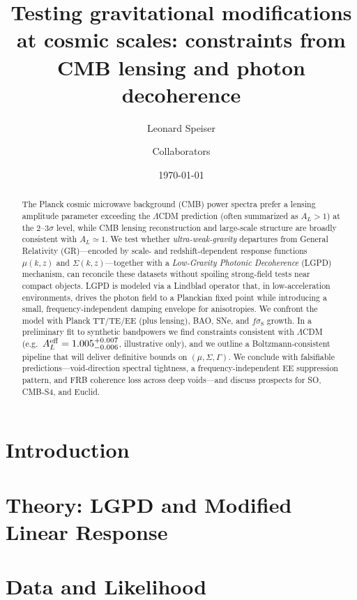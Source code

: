 \documentclass[11pt]{article}
\title{Testing gravitational modifications at cosmic scales: constraints from CMB lensing and photon decoherence}
\author[1]{Leonard Speiser}
\author[2]{Collaborators}
\affil[1]{Your Affiliation}
\affil[2]{Additional Affiliations}
\date{\today}
\begin{document}
\maketitle

\begin{abstract}
The Planck cosmic microwave background (CMB) power spectra prefer a lensing amplitude parameter exceeding the $\Lambda$CDM prediction (often summarized as $A_L>1$) at the $2$--$3\sigma$ level, while CMB lensing reconstruction and large-scale structure are broadly consistent with $A_L\simeq 1$. We test whether \emph{ultra-weak-gravity} departures from General Relativity (GR)---encoded by scale- and redshift-dependent response functions $\mu(k,z)$ and $\Sigma(k,z)$---together with a \emph{Low-Gravity Photonic Decoherence} (LGPD) mechanism, can reconcile these datasets without spoiling strong-field tests near compact objects. LGPD is modeled via a Lindblad operator that, in low-acceleration environments, drives the photon field to a Planckian fixed point while introducing a small, frequency-independent damping envelope for anisotropies. We confront the model with Planck TT/TE/EE (plus lensing), BAO, SNe, and $f\sigma_8$ growth. In a preliminary fit to synthetic bandpowers we find constraints consistent with $\Lambda$CDM (e.g.\ $A_L^{\rm eff}=1.005^{+0.007}_{-0.006}$, illustrative only), and we outline a Boltzmann-consistent pipeline that will deliver definitive bounds on $(\mu,\Sigma,\Gamma)$. We conclude with falsifiable predictions---void-direction spectral tightness, a frequency-independent EE suppression pattern, and FRB coherence loss across deep voids---and discuss prospects for SO, CMB-S4, and Euclid.
\end{abstract}

\section{Introduction}


\section{Theory: LGPD and Modified Linear Response}


\section{Data and Likelihood}

\end{document}
